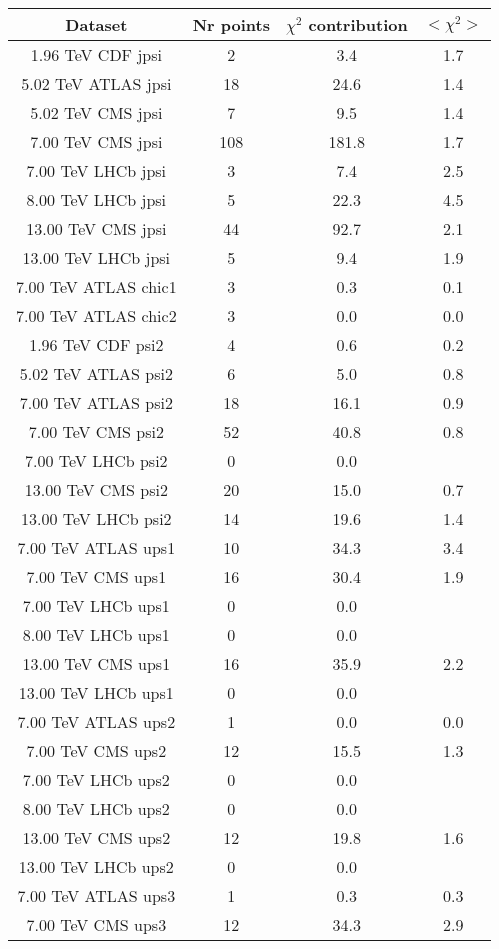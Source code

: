 \begin{table}[h!]
\centering
\begin{tabular}{c|c|c|c}
Dataset & Nr points & $\chi^2$ contribution & $<\chi^2>$ \\
\hline
1.96 TeV CDF jpsi & 2 & 3.4 & 1.7 \\
5.02 TeV ATLAS jpsi & 18 & 24.6 & 1.4 \\
5.02 TeV CMS jpsi & 7 & 9.5 & 1.4 \\
7.00 TeV CMS jpsi & 108 & 181.8 & 1.7 \\
7.00 TeV LHCb jpsi & 3 & 7.4 & 2.5 \\
8.00 TeV LHCb jpsi & 5 & 22.3 & 4.5 \\
13.00 TeV CMS jpsi & 44 & 92.7 & 2.1 \\
13.00 TeV LHCb jpsi & 5 & 9.4 & 1.9 \\
7.00 TeV ATLAS chic1 & 3 & 0.3 & 0.1 \\
7.00 TeV ATLAS chic2 & 3 & 0.0 & 0.0 \\
1.96 TeV CDF psi2 & 4 & 0.6 & 0.2 \\
5.02 TeV ATLAS psi2 & 6 & 5.0 & 0.8 \\
7.00 TeV ATLAS psi2 & 18 & 16.1 & 0.9 \\
7.00 TeV CMS psi2 & 52 & 40.8 & 0.8 \\
7.00 TeV LHCb psi2 & 0 & 0.0 &  \\
13.00 TeV CMS psi2 & 20 & 15.0 & 0.7 \\
13.00 TeV LHCb psi2 & 14 & 19.6 & 1.4 \\
7.00 TeV ATLAS ups1 & 10 & 34.3 & 3.4 \\
7.00 TeV CMS ups1 & 16 & 30.4 & 1.9 \\
7.00 TeV LHCb ups1 & 0 & 0.0 &  \\
8.00 TeV LHCb ups1 & 0 & 0.0 &  \\
13.00 TeV CMS ups1 & 16 & 35.9 & 2.2 \\
13.00 TeV LHCb ups1 & 0 & 0.0 &  \\
7.00 TeV ATLAS ups2 & 1 & 0.0 & 0.0 \\
7.00 TeV CMS ups2 & 12 & 15.5 & 1.3 \\
7.00 TeV LHCb ups2 & 0 & 0.0 &  \\
8.00 TeV LHCb ups2 & 0 & 0.0 &  \\
13.00 TeV CMS ups2 & 12 & 19.8 & 1.6 \\
13.00 TeV LHCb ups2 & 0 & 0.0 &  \\
7.00 TeV ATLAS ups3 & 1 & 0.3 & 0.3 \\
7.00 TeV CMS ups3 & 12 & 34.3 & 2.9 \\

\end{tabular}
\end{table}
